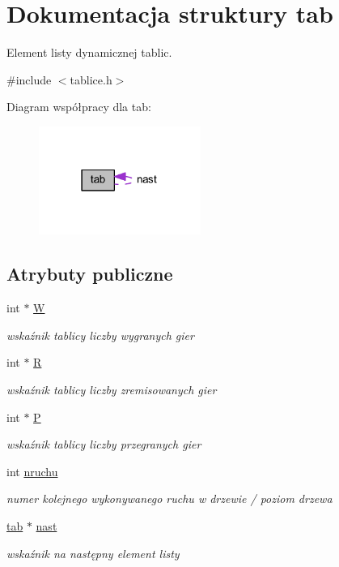 \hypertarget{structtab}{}\section{Dokumentacja struktury tab}
\label{structtab}


Element listy dynamicznej tablic.  




{\ttfamily \#include $<$tablice.\+h$>$}



Diagram współpracy dla tab\+:\nopagebreak
\begin{figure}[H]
\begin{center}
\leavevmode
\includegraphics[width=150pt]{structtab__coll__graph}
\end{center}
\end{figure}
\subsection*{Atrybuty publiczne}
\begin{DoxyCompactItemize}
\item 
int $\ast$ \hyperlink{structtab_ad2b320d15f1496ed3147a7cdb2e5e1fb}{W}
\begin{DoxyCompactList}\small\item\em wskaźnik tablicy liczby wygranych gier \end{DoxyCompactList}\item 
int $\ast$ \hyperlink{structtab_acc9e4ee7e5e6df2449875e0a1dc67b18}{R}
\begin{DoxyCompactList}\small\item\em wskaźnik tablicy liczby zremisowanych gier \end{DoxyCompactList}\item 
int $\ast$ \hyperlink{structtab_aa99978b9e36e661312d4ac4581421a28}{P}
\begin{DoxyCompactList}\small\item\em wskaźnik tablicy liczby przegranych gier \end{DoxyCompactList}\item 
int \hyperlink{structtab_a8b52ff4e9a57646f4890690e1266c16f}{nruchu}
\begin{DoxyCompactList}\small\item\em numer kolejnego wykonywanego ruchu w drzewie / poziom drzewa \end{DoxyCompactList}\item 
\hyperlink{structtab}{tab} $\ast$ \hyperlink{structtab_abca0375dfae9e97ee6b0457d3b562ac9}{nast}
\begin{DoxyCompactList}\small\item\em wskaźnik na następny element listy \end{DoxyCompactList}\end{DoxyCompactItemize}



